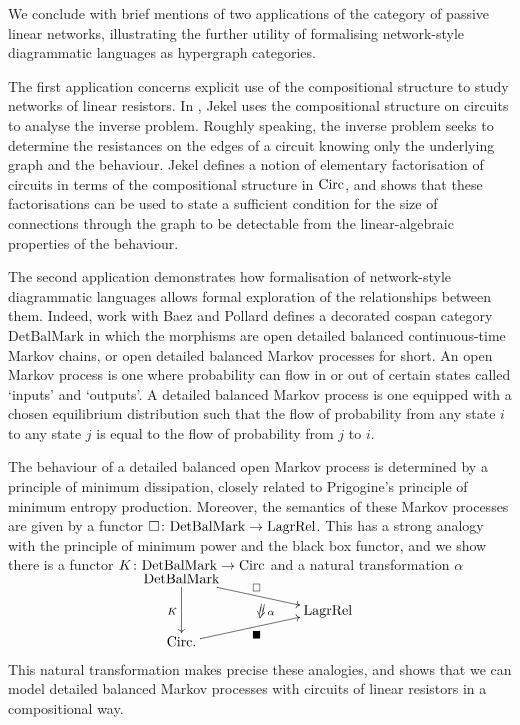 We conclude with brief mentions of two applications of the category of passive
linear networks, illustrating the further utility of formalising network-style
diagrammatic languages as hypergraph categories.

The first application concerns explicit use of the compositional structure to
study networks of linear resistors. In \cite{Jek}, Jekel uses the compositional
structure on circuits to analyse the inverse problem. Roughly speaking, the
inverse problem seeks to determine the resistances on the edges of a circuit
knowing only the underlying graph and the behaviour. Jekel defines a notion of
elementary factorisation of circuits in terms of the compositional structure in
$\mathrm{Circ}$, and shows that these factorisations can be used to state a sufficient
condition for the size of connections through the graph to be detectable from
the linear-algebraic properties of the behaviour.

The second application demonstrates how formalisation of network-style
diagrammatic languages allows formal exploration of the relationships between
them. Indeed, work with Baez and Pollard \cite{BFP,Pol16} defines a decorated cospan
category $\mathrm{DetBalMark}$ in which the morphisms are open detailed balanced
continuous-time Markov chains, or open detailed balanced Markov processes for
short.  An open Markov process is one where probability can flow in or out of
certain states called `inputs' and `outputs'. A detailed balanced Markov process
is one equipped with a chosen equilibrium distribution such that the flow of
probability from any state $i$ to any state $j$ is equal to the flow of
probability from $j$ to $i$. 

The behaviour of a detailed balanced open Markov process is determined by a
principle of minimum dissipation, closely related to Prigogine's principle of
minimum entropy production. Moreover, the semantics of these Markov processes are
given by a functor $\square{\colon} \mathrm{DetBalMark} \to \mathrm{LagrRel}$. This has a strong analogy with the principle of
minimum power and the black box functor, and we show there is a functor $K{\colon}
\mathrm{DetBalMark} \to \mathrm{Circ}$ and a natural transformation $\alpha$
\[
  \xymatrixrowsep{2ex}
  \xymatrix{
    \mathrm{DetBalMark} \ar[dd]_{K} \ar[drr]^{\square}  \\
    &\twocell \omit{_\:\alpha}& \mathrm{LagrRel} \\
    \Circ. \ar[urr]_{\blacksquare} 
  }
\]
This natural transformation makes precise these analogies, and shows that we can
model detailed balanced Markov processes with circuits of linear resistors in a
compositional way.


